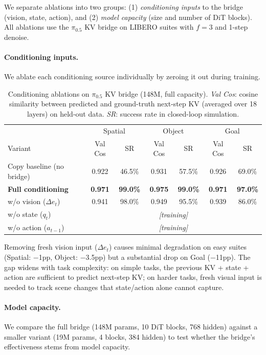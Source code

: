 \documentclass{article}
\begin{document}
We separate ablations into two groups: (1) \emph{conditioning inputs} to the bridge (vision, state, action), and (2) \emph{model capacity} (size and number of DiT blocks). All ablations use the $\pi_{0.5}$ KV bridge on LIBERO suites with $f{=}3$ and 1-step denoise.

\paragraph{Conditioning inputs.}
We ablate each conditioning source individually by zeroing it out during training.

\begin{table}[h]
\caption{Conditioning ablations on $\pi_{0.5}$ KV bridge (148M, full capacity). \emph{Val Cos}: cosine similarity between predicted and ground-truth next-step KV (averaged over 18 layers) on held-out data. \emph{SR}: success rate in closed-loop simulation.}
\label{tab:ablation_cond}
\centering
\small
\begin{tabular}{l|cc|cc|cc}
\toprule
 & \multicolumn{2}{c|}{Spatial} & \multicolumn{2}{c|}{Object} & \multicolumn{2}{c}{Goal} \\
Variant & Val Cos & SR & Val Cos & SR & Val Cos & SR \\
\midrule
Copy baseline (no bridge)  & 0.922 & 46.5\% & 0.931 & 57.5\% & 0.926 & 69.0\% \\
\textbf{Full conditioning} & \textbf{0.971} & \textbf{99.0\%} & \textbf{0.975} & \textbf{99.0\%} & \textbf{0.971} & \textbf{97.0\%} \\
\quad w/o vision ($\Delta e_t$)     & 0.941 & 98.0\% & 0.949 & 95.5\% & 0.939 & 86.0\% \\
\quad w/o state ($q_t$)             & \multicolumn{6}{c}{\textit{[training]}} \\
\quad w/o action ($a_{t-1}$)        & \multicolumn{6}{c}{\textit{[training]}} \\
\bottomrule
\end{tabular}
\end{table}

Removing fresh vision input ($\Delta e_t$) causes minimal degradation on easy suites (Spatial: $-$1pp, Object: $-$3.5pp) but a substantial drop on Goal ($-$11pp).
The gap widens with task complexity: on simple tasks, the previous KV + state + action are sufficient to predict next-step KV; on harder tasks, fresh visual input is needed to track scene changes that state/action alone cannot capture.

\paragraph{Model capacity.}
We compare the full bridge (148M params, 10 DiT blocks, 768 hidden) against a smaller variant (19M params, 4 blocks, 384 hidden) to test whether the bridge's effectiveness stems from model capacity.
\end{document}
